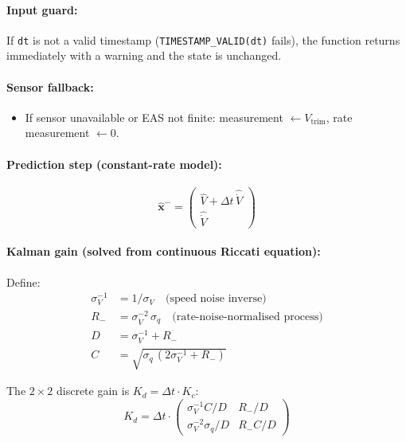\documentclass[12pt,a4paper]{article}
\begin{document}
\paragraph{Input guard:} If \texttt{dt} is not a valid timestamp
(\texttt{TIMESTAMP\_VALID(dt)} fails), the function returns immediately
with a warning and the state is unchanged.

\paragraph{Sensor fallback:}
\begin{itemize}
  \item If sensor unavailable or EAS not finite:
        measurement $\leftarrow V_{\text{trim}}$,
        rate measurement $\leftarrow 0$.
\end{itemize}

\paragraph{Prediction step (constant-rate model):}
\begin{equation}
  \hat{\mathbf{x}}^- =
  \begin{pmatrix} \hat{V} + \Delta t\,\hat{\dot{V}} \\ \hat{\dot{V}} \end{pmatrix}
\end{equation}

\paragraph{Kalman gain (solved from continuous Riccati equation):}

Define:
\begin{align}
  \sigma_V^{-1} &= 1/\sigma_V \quad\text{(speed noise inverse)} \\
  R_{-} &= \sigma_{\dot{V}}^{-2}\,\sigma_q \quad\text{(rate-noise-normalised process)} \\
  D     &= \sigma_V^{-1} + R_{-} \\
  C     &= \sqrt{\sigma_q\,(2\sigma_V^{-1} + R_{-})}
\end{align}

The $2\times 2$ discrete gain is $K_d = \Delta t \cdot K_c$:
\begin{equation}
  K_d = \Delta t \cdot
  \begin{pmatrix}
    \sigma_V^{-1} C / D & R_{-}/D \\
    \sigma_V^{-2}\sigma_q/D & R_{-}C/D
  \end{pmatrix}
\end{equation}
\end{document}

